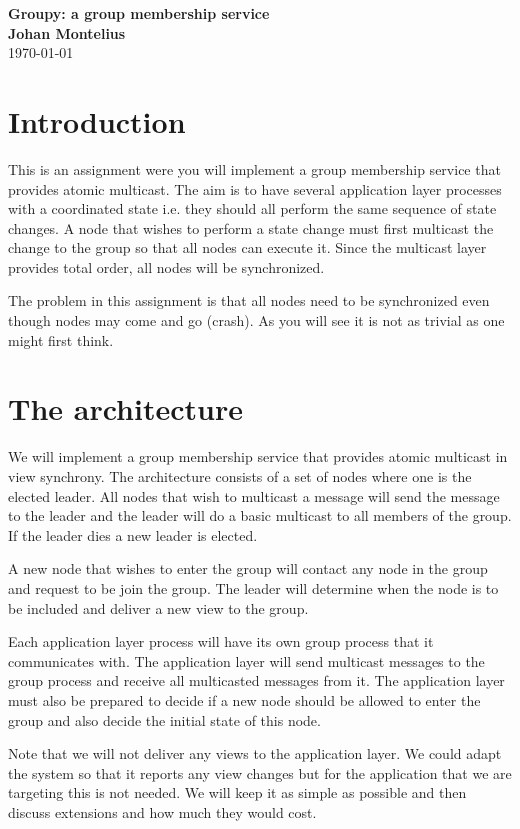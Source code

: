 \documentclass[a4paper,11pt]{article}
\newcommand{\nnsection}[1]{
\section*{#1}
\addcontentsline{toc}{section}{#1}
}
\begin{document}
\begin{center}
\vspace{20pt}
\textbf{\large Groupy: a group membership service}\\
\vspace{10pt}
\textbf{Johan Montelius}\\
\vspace{10pt}
\today{}
\end{center}

\nnsection{Introduction}

This is an assignment were you will implement a group membership
service that provides atomic multicast. The aim is to have several
application layer processes with a coordinated state i.e. they should all
perform the same sequence of state changes. A node that wishes to
perform a state change must first multicast the change to the group
so that all nodes can execute it. Since the multicast layer provides
total order, all nodes will be synchronized.

The problem in this assignment is that all nodes need to be
synchronized even though nodes may come and go (crash). As you will
see it is not as trivial as one might first think.


\section{The architecture}

We will implement a group membership service that provides atomic
multicast in view synchrony. The architecture consists of a set of nodes
where one is the elected leader. All nodes that wish to multicast a
message will send the message to the leader and the leader will do a
basic multicast to all members of the group. If the leader dies a new
leader is elected.

A new node that wishes to enter the group will contact any node in the
group and request to be join the group. The leader will determine
when the node is to be included and deliver a new view to the
group.

Each application layer process will have its own group process that it
communicates with. The application layer will send multicast messages
to the group process and receive all multicasted messages from it. The
application layer must also be prepared to decide if a new node should
be allowed to enter the group and also decide the initial state of
this node.

 Note that we will not deliver any views to the application layer. We
 could adapt the system so that it reports any view changes but for
 the application that we are targeting this is not needed. We will
 keep it as simple as possible and then discuss extensions and how
 much they would cost.
\end{document}
